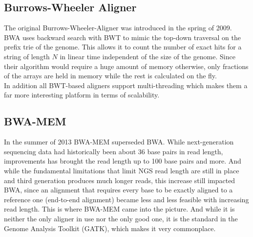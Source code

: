 \documentclass[conference]{IEEEtran}
\begin{document}
\vspace{0.5cm}




\subsection{Burrows-Wheeler Aligner}

The original Burrows-Wheeler-Aligner was introduced in the spring of 2009. BWA uses backward search with BWT to mimic the top-down traversal on the prefix trie of the genome. This allows it to count the number of exact hits for a string of length $N$ in linear time independent of the size of the genome. Since their algorithm would require a huge amount of memory otherwise, only fractions of the arrays are held in memory while the rest is calculated on the fly\cite{li_fast_2009}. \\
In addition all BWT-based aligners support multi-threading which makes them a far more interesting platform in terms of scalability. 

\subsection{BWA-MEM}

In the summer of 2013 BWA-MEM superseded BWA. While next-generation sequencing data had historically been about 36 base pairs in read length, improvements has brought the read length up to 100 base pairs and more. And while the fundamental limitations that limit NGS read length are still in place and third generation produces much longer reads, this increase still impacted BWA, since an alignment that requires every base to be exactly aligned to a reference one (end-to-end alignment) became less and less feasible with increasing read length. This is where BWA-MEM came into the picture. And while it is neither the only aligner in use nor the only good one, it is the standard in the Genome Analysis Toolkit (GATK), which makes it very commonplace\cite{li_aligning_2013}\cite{noauthor_technical_nodate}. 
\end{document}

